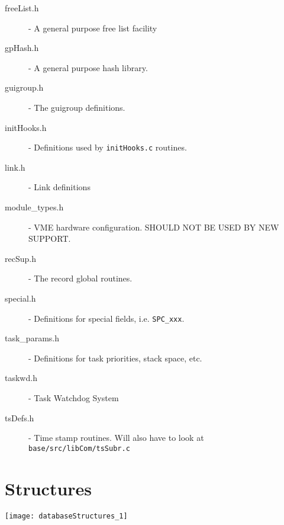 \begin{description}
\item[freeList.h] - A general purpose free list facility

\item[gpHash.h] - A general purpose hash library.

\item[guigroup.h] - The guigroup definitions.

\item[initHooks.h] - Definitions used by \verb|initHooks.c| routines.

\item[link.h] - Link definitions

\item[module\_types.h] - VME hardware configuration. SHOULD NOT BE USED BY NEW SUPPORT.

\item[recSup.h] - The record global routines.

\item[special.h] - Definitions for special fields, i.e. \verb|SPC_xxx|.

\item[task\_params.h] - Definitions for task priorities, stack space, etc.

\item[taskwd.h] - Task Watchdog System

\item[tsDefs.h] - Time stamp routines. Will also have to look at \verb|base/src/libCom/tsSubr.c|

\end{description}

\newpage

\section{Structures}

\begin{center}

\texttt{[image: databaseStructures\_1]}

\end{center}
